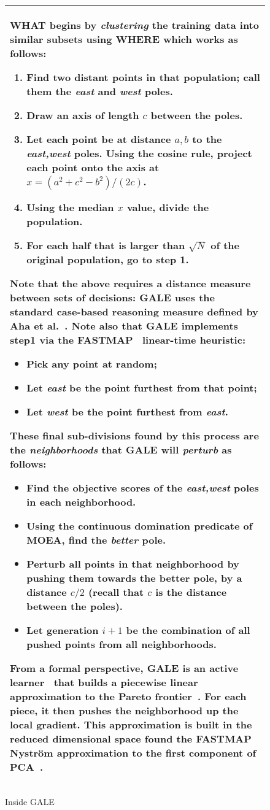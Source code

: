 \documentclass[conference]{IEEEtran}
\begin{document}
\begin{figure}[!b]
\small
\begin{tabular}{|p{.95\linewidth}|}\hline
WHAT begins by \textit{clustering} the training data into similar subsets using WHERE which works as follows:
\begin{enumerate}
\item Find two distant points in that population; call them the {\em east} and {\em west} poles. 
\item Draw an axis of length $c$ between the poles. 
\item Let each point be at distance $a,b$ to the {\em east,west} poles.  Using the cosine rule, project each point onto the  axis  at $x=(a^2 + c^2 - b^2)/(2c)$.  
\item Using the median $x$ value, divide the population.
\item For each half that is larger than $\sqrt{N}$ of the original population, go to step 1.
\end{enumerate}

Note that the above requires a distance measure between sets of decisions: GALE uses the standard case-based reasoning measure defined by Aha et al.~\cite{aha91}. Note also that GALE implements step1 via  the FASTMAP~\cite{Faloutsos1995} linear-time
heuristic:
\begin{itemize}
\item Pick any point at random; 
\item Let {\em east} be the point furthest from that point; 
\item Let {\em west} be the point furthest from {\em east}.
\end{itemize}

These final sub-divisions found by this process are the {\em neighborhoods} that GALE will {\em perturb} as follows:
\begin{itemize}
\item Find the objective scores of the {\em east,west} poles in each neighborhood.
\item Using the continuous domination predicate of MOEA, find  the {\em better} pole. 
\item Perturb all points in that neighborhood by pushing them towards the better pole, by a distance  $c/2$ (recall that  $c$ is the distance between the poles).
\item Let generation $i+1$ be the combination of all pushed points from all neighborhoods.
\end{itemize}

From a formal perspective, GALE is an active learner~\cite{Dasgupta2005} that builds a piecewise linear approximation to the Pareto frontier~\cite{Zuluaga:13}.  For each piece, it then pushes the neighborhood up the local gradient.  This  approximation is built in the reduced dimensional space found the FASTMAP  Nystr\"om approximation to the first component of PCA~\cite{platt05}.
\\\hline
\end{tabular}
\caption{Inside GALE}\label{fig:gale}
\end{figure}
\end{document}
